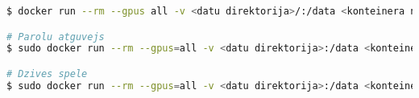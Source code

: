 \begin{lstlisting}[caption={Docker konteinera darbināšanas konfigurācija},
  label=lst:docker_konteinera_run,
  captionpos=t,
  language=bash
]
$ docker run --rm --gpus all -v <datu direktorija>/:/data <konteinera nosaukums> /data/<apstradajamais fails> /data/<izvada fails> <citas opcijas ...>

# Parolu atguvejs 
$ sudo docker run --rm --gpus=all -v <datu direktorija>:/data <konteinera nosaukums> /data/<parolu faila cels> /data/<paroles hash vertiba> /data<zurnalfaila cels> /data/<zurnafails>

# Dzives spele 
$ sudo docker run --rm --gpus=all -v <datu direktorija>:/data <konteinera nosaukums> /data/<ieejas rezga faila cels> /data/<izejas rezga faila cels> /data<automata solu skaits> <zurnalfaila cels> 
\end{lstlisting}

